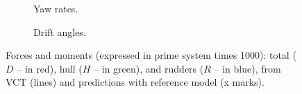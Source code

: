 \begin{figure}[h]
    \begin{center}
        
        \caption{}
        \label{fig:KVLCC2_HMRI}
    \end{center}
\end{figure}

\begin{figure}
    \centering
    \begin{subfigure}[b]{0.49\textwidth}
        \centering
        
        \caption{Yaw rates.}
        \label{fig:vct_circle}
    \end{subfigure}
    \hfill
    \begin{subfigure}[b]{0.49\textwidth}
        \centering
        
        \caption{Drift angles.}
        \label{fig:vct_drift_angle}
    \end{subfigure}
    \caption{Forces and moments (expressed in prime system times 1000): total ($D$ -- in red), hull ($H$ -- in green), and rudders ($R$ -- in blue), from VCT (lines) and predictions with reference model (x marks).}
    \label{fig:vct}
\end{figure}